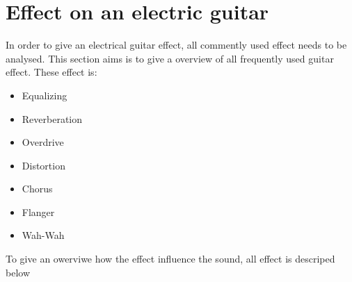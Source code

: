 

\section{Effect on an electric guitar}
In order to give an electrical guitar effect, all commently used effect needs to be analysed. This section aims is to give a overview of all frequently used guitar effect. These effect is: 

\begin{itemize}
 \item Equalizing
 \item Reverberation
 \item Overdrive
 \item Distortion
 \item Chorus
 \item Flanger
 \item Wah-Wah
\end{itemize}

To give an owerviwe how the effect influence the sound, all effect is descriped below

\label{sec:equalizing} 
\label{sec:delay} 
\label{sec:reverberation} 
\label{sec:overdrive} 
\label{sec:chorus} 
\label{sec:wah-wah} 
